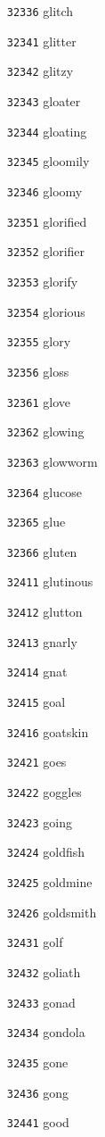 \documentclass[twoside,11pt]{article}
\begin{document}
\begin{multicols}{5}
\begin{enumerate}
\item[\texttt{32336}] glitch
\item[\texttt{32341}] glitter
\item[\texttt{32342}] glitzy
\item[\texttt{32343}] gloater
\item[\texttt{32344}] gloating
\item[\texttt{32345}] gloomily
\item[\texttt{32346}] gloomy
\item[\texttt{32351}] glorified
\item[\texttt{32352}] glorifier
\item[\texttt{32353}] glorify
\item[\texttt{32354}] glorious
\item[\texttt{32355}] glory
\item[\texttt{32356}] gloss
\item[\texttt{32361}] glove
\item[\texttt{32362}] glowing
\item[\texttt{32363}] glowworm
\item[\texttt{32364}] glucose
\item[\texttt{32365}] glue
\item[\texttt{32366}] gluten
\item[\texttt{32411}] glutinous
\item[\texttt{32412}] glutton
\item[\texttt{32413}] gnarly
\item[\texttt{32414}] gnat
\item[\texttt{32415}] goal
\item[\texttt{32416}] goatskin
\item[\texttt{32421}] goes
\item[\texttt{32422}] goggles
\item[\texttt{32423}] going
\item[\texttt{32424}] goldfish
\item[\texttt{32425}] goldmine
\item[\texttt{32426}] goldsmith
\item[\texttt{32431}] golf
\item[\texttt{32432}] goliath
\item[\texttt{32433}] gonad
\item[\texttt{32434}] gondola
\item[\texttt{32435}] gone
\item[\texttt{32436}] gong
\item[\texttt{32441}] good

\end{enumerate}
\end{multicols}
\end{document}
